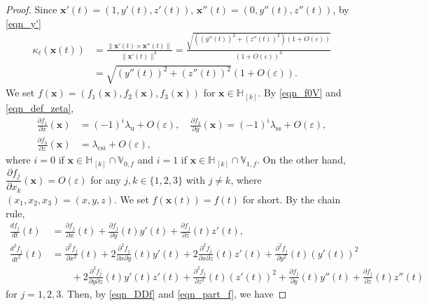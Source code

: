 \documentclass{amsart}
\theoremstyle{definition}
\numberwithin{equation}{section}
\numberwithin{figure}{section}
\begin{document}
\begin{proof}
Since $\boldsymbol{x}'(t)=(1,y'(t),z'(t))$, $\boldsymbol{x}''(t)=(0,y''(t),z''(t))$, by \eqref{eqn_y'} 
\begin{equation}\label{eqn_kappa_l}
\begin{split}
\kappa_\ell(\boldsymbol{x}(t))&=\frac{\|\boldsymbol{x}'(t)\times \boldsymbol{x}''(t)\|}{\|\boldsymbol{x}'(t)\|^3}=\frac{\sqrt{((y''(t))^2+(z''(t))^2)(1+O(\varepsilon))}}{(1+O(\varepsilon))^3}\\
&=\sqrt{(y''(t))^2+(z''(t))^2}(1+O(\varepsilon)).
\end{split}
\end{equation}
We set $f(\boldsymbol{x})=(f_1(\boldsymbol{x}),f_2(\boldsymbol{x}),f_3(\boldsymbol{x}))$ for $\boldsymbol{x}\in \mathbb{H}_{\,[k]}$.
By \eqref{eqn_f0V} and \eqref{eqn_def_zeta}, 
\begin{equation}\label{eqn_part_f}
\begin{split}
\frac{\partial f_1}{\partial x}(\boldsymbol{x})&=(-1)^i\lambda_{\mathrm{u}}+O(\varepsilon),\quad  
\frac{\partial f_2}{\partial y}(\boldsymbol{x})=(-1)^i\lambda_{\mathrm{ss}}+O(\varepsilon),\\
\frac{\partial f_3}{\partial z}(\boldsymbol{x})&=\lambda_{\mathrm{cs} i}+O(\varepsilon),
\end{split}
\end{equation}
where $i=0$ if $\boldsymbol{x}\in \mathbb{H}_{\,[k]}\cap \mathbb{V}_{0,f}$ and $i=1$ if $\boldsymbol{x}\in \mathbb{H}_{\,[k]}\cap\mathbb{V}_{1,f}$.
On the other hand, $\dfrac{\partial f_j}{\partial x_k}(\boldsymbol{x})=O(\varepsilon)$ for any $j,k\in \{1,2,3\}$ with $j\neq k$, where $(x_1,x_2,x_3)=(x,y,z)$.
We set $f(\boldsymbol{x}(t))=f(t)$ for short.
By the chain rule, 
\begin{align*}
\frac{df_j}{dt}(t)&=\frac{\partial f_j}{\partial x}(t)+\frac{\partial f_j}{\partial y}(t)y'(t)
+\frac{\partial f_j}{\partial z}(t)z'(t),\\
\frac{d^2f_j}{dt^2}(t)&=\frac{\partial^2 f_j}{\partial x^2}(t)+2\frac{\partial^2 f_j}{\partial x\partial y}(t)y'(t)
+2\frac{\partial^2 f_j}{\partial x\partial z}(t)z'(t)
+\frac{\partial^2 f_j}{\partial y^2}(t)(y'(t))^2\\
&\qquad+2\frac{\partial^2 f_j}{\partial y\partial z}(t)y'(t)z'(t)+\frac{\partial^2 f_j}{\partial z^2}(t)(z'(t))^2
+\frac{\partial f_j}{\partial y}(t)y''(t)+\frac{\partial f_j}{\partial z}(t)z''(t)
\end{align*}
for $j=1,2,3$.
Then, by \eqref{eqn_DDf} and \eqref{eqn_part_f}, we have

\end{proof}
\end{document}

